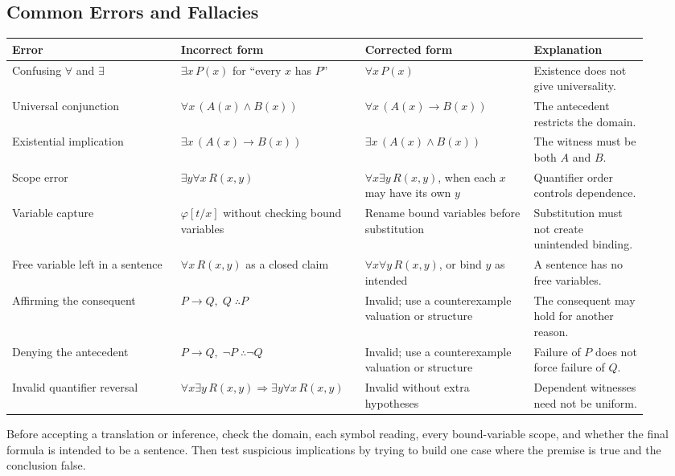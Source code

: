 
\subsection*{Common Errors and Fallacies}

\begin{remark*}
\renewcommand{\arraystretch}{1.35}
\begin{tabular}{p{0.25\linewidth} p{0.25\linewidth} p{0.25\linewidth} p{0.17\linewidth}}
\toprule
\textbf{Error} & \textbf{Incorrect form} & \textbf{Corrected form} & \textbf{Explanation} \\
\midrule
Confusing \(\forall\) and \(\exists\) &
\(\exists x\,P(x)\) for ``every \(x\) has \(P\)'' &
\(\forall x\,P(x)\) &
Existence does not give universality. \\
Universal conjunction &
\(\forall x\,(A(x)\land B(x))\) &
\(\forall x\,(A(x)\to B(x))\) &
The antecedent restricts the domain. \\
Existential implication &
\(\exists x\,(A(x)\to B(x))\) &
\(\exists x\,(A(x)\land B(x))\) &
The witness must be both \(A\) and \(B\). \\
Scope error &
\(\exists y\forall x\,R(x,y)\) &
\(\forall x\exists y\,R(x,y)\), when each \(x\) may have its own \(y\) &
Quantifier order controls dependence. \\
Variable capture &
\(\varphi[t/x]\) without checking bound variables &
Rename bound variables before substitution &
Substitution must not create unintended binding. \\
Free variable left in a sentence &
\(\forall x\,R(x,y)\) as a closed claim &
\(\forall x\forall y\,R(x,y)\), or bind \(y\) as intended &
A sentence has no free variables. \\
Affirming the consequent &
\(P\to Q,\;Q\;\therefore P\) &
Invalid; use a counterexample valuation or structure &
The consequent may hold for another reason. \\
Denying the antecedent &
\(P\to Q,\;\neg P\;\therefore\neg Q\) &
Invalid; use a counterexample valuation or structure &
Failure of \(P\) does not force failure of \(Q\). \\
Invalid quantifier reversal &
\(\forall x\exists y\,R(x,y)\Rightarrow \exists y\forall x\,R(x,y)\) &
Invalid without extra hypotheses &
Dependent witnesses need not be uniform. \\
\bottomrule
\end{tabular}
\end{remark*}

\begin{remark*}
Before accepting a translation or inference, check the domain, each symbol
reading, every bound-variable scope, and whether the final formula is intended
to be a sentence. Then test suspicious implications by trying to build one
case where the premise is true and the conclusion false.
\end{remark*}
